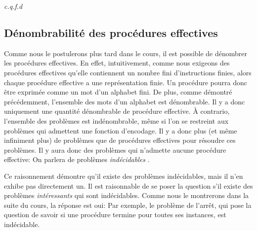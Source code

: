 \textit{c.q.f.d}

\subsection{Dénombrabilité des procédures effectives}

Comme nous le postulerons plus tard dans le cours, il est possible de dénombrer les procédures effectives.
En effet, intuitivement, comme nous exigeons des procédures effectives qu'elle contiennent un nombre fini d'instructions finies, alors chaque procédure effective a une représentation finie.
Un procédure pourra donc être exprimée comme un mot d'un alphabet fini.
De  plus, comme démontré précédemment, l'ensemble des mots d'un alphabet est dénombrable.
Il y a donc uniquement une quantité dénombrable de procédure effective.
À contrario, l'ensemble des problèmes est indénombrable, même si l'on se restreint aux problèmes qui admettent une fonction d'encodage.
Il y a donc plus (et même infiniment plus) de problèmes que de procédures effectives pour résoudre ces problèmes.
Il y aura donc des problèmes qui n'admette aucune procédure effective: On parlera de problèmes \og \textit{indécidables} \fg{}.

Ce raisonnement démontre qu'il existe des problèmes indécidables, mais il n'en exhibe pas directement un.
Il est raisonnable de se poser la question s'il existe des problèmes \textit{intéressants} qui sont indécidables.
Comme nous le montrerons dans la suite du cours, la réponse est oui:
Par exemple, le problème de l'arrêt, qui pose la question de savoir si une procédure termine pour toutes ses instances, est indécidable.


 